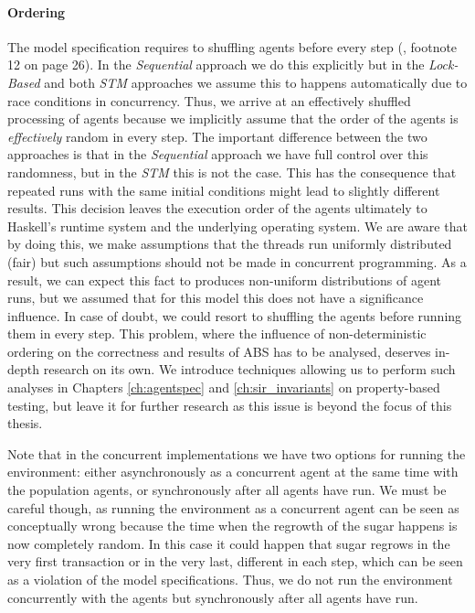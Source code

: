 \paragraph{Ordering} The model specification requires to shuffling agents before every step (\cite{epstein_growing_1996}, footnote 12 on page 26). In the \textit{Sequential} approach we do this explicitly but in the \textit{Lock-Based} and both \textit{STM} approaches we assume this to happens automatically due to race conditions in concurrency. Thus, we arrive at an effectively shuffled processing of agents because we implicitly assume that the order of the agents is \textit{effectively} random in every step. The important difference between the two approaches is that in the \textit{Sequential} approach we have full control over this randomness, but in the \textit{STM} this is not the case. This has the consequence that repeated runs with the same initial conditions might lead to slightly different results. 
This decision leaves the execution order of the agents ultimately to Haskell's runtime system and the underlying operating system. We are aware that by doing this, we make assumptions that the threads run uniformly distributed (fair) but such assumptions should not be made in concurrent programming. As a result, we can expect this fact to produces non-uniform distributions of agent runs, but we assumed that for this model this does not have a significance influence. In case of doubt, we could resort to shuffling the agents before running them in every step. This problem, where the influence of non-deterministic ordering on the correctness and results of ABS has to be analysed, deserves in-depth research on its own. We introduce techniques allowing us to perform such analyses in Chapters \ref{ch:agentspec} and \ref{ch:sir_invariants} on property-based testing, but leave it for further research as this issue is beyond the focus of this thesis.

Note that in the concurrent implementations we have two options for running the environment: either asynchronously as a concurrent agent at the same time with the population agents, or synchronously after all agents have run. We must be careful though, as running the environment as a concurrent agent can be seen as conceptually wrong because the time when the regrowth of the sugar happens is now completely random. In this case it could happen that sugar regrows in the very first transaction or in the very last, different in each step, which can be seen as a violation of the model specifications. Thus, we do not run the environment concurrently with the agents but synchronously after all agents have run.

